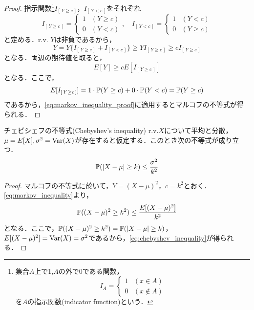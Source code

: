 \documentclass[main.tex]{subfiles}
\begin{document}
\begin{proof}
  指示関数\footnote{集合$A$上で1,$A$の外で0である関数，
  \begin{equation*}
    I_{A} = \begin{cases}
      1 & (x \in A) \\
      0 & (x \notin A)
    \end{cases}
  \end{equation*}
  を$A$の指示関数(indicator function)という．}$I_{[\,Y \geq c\,]}$，$I_{[\,Y < c\,]}$をそれぞれ
  \begin{equation}
    I_{[\,Y \geq c\,]} = \begin{cases}
      1 & (Y \geq c) \\
      0 & (Y < c)
    \end{cases}, \quad
    I_{[\,Y < c\,]} = \begin{cases}
      1 & (Y < c) \\
      0 & (Y \geq c)
    \end{cases}
  \end{equation}
  と定める．r.v. $Y$は非負であるから，
  \begin{equation}
    Y = Y \{I_{[\,Y \geq c\,]} + I_{[\,Y < c\,]}\} \geq Y  I_{[\,Y \geq c\,]} \geq c  I_{[\,Y \geq c\,]}
  \end{equation}
  となる．両辺の期待値を取ると，
  \begin{equation}
    E[Y] \geq c E[I_{[\,Y \geq c\,]}] 
    \label{eq:markov_inequality_proof}
  \end{equation}
  となる．ここで，
  \begin{equation}
    E[I_{[\,Y \geq c\,]}] = 1 \cdot \mathbb{P}(Y \geq c) + 0 \cdot \mathbb{P}(Y < c) = \mathbb{P}(Y \geq c)
  \end{equation}
  であるから，\eqref{eq:markov_inequality_proof}に適用するとマルコフの不等式が得られる．
\end{proof}
\begin{mylemma}{チェビシェフの不等式(Chebyshev's inequality)}
\label{lem:chebyshev_inequality} %
  r.v.$X$について平均と分散，$\mu = E[X], \sigma^2=\operatorname{Var}(X)$が存在すると仮定する．このとき次の不等式が成り立つ．
  \begin{equation}
    \mathbb{P}(|X - \mu| \geq k) \leq \frac{\sigma^2}{k^2} 
    \label{eq:chebyshev_inequality}
  \end{equation}
  \end{mylemma}
\begin{proof}
  \hyperref[lem:markov_inequality]{マルコフの不等式}に於いて，$Y = (X - \mu)^2$，$c = k^2$とおく．
  \eqref{eq:markov_inequality}より，
  \begin{equation}
    \mathbb{P}((X - \mu)^2 \geq k^2) \leq \frac{E[(X - \mu)^2]}{k^2} 
  \end{equation}
となる．ここで，$\mathbb{P}((X - \mu)^2 \geq k^2) = \mathbb{P}(|X - \mu| \geq k)$，$E[(X - \mu)^2] = \operatorname{Var}(X) = \sigma^2$であるから，\eqref{eq:chebyshev_inequality}が得られる．
\end{proof}
\end{document}
